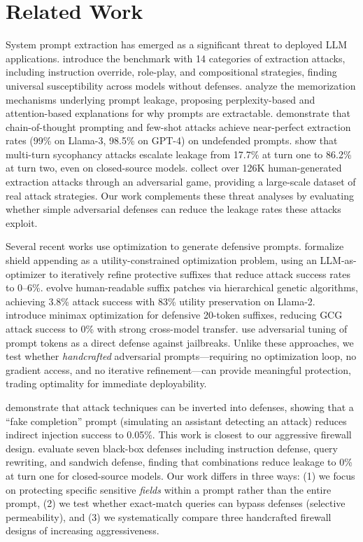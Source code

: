 \section{Related Work}
\label{sec:related}

System prompt extraction has emerged as a significant threat to deployed LLM applications.
\citet{wang2024raccoon} introduce the \raccoon benchmark with 14 categories of extraction attacks, including instruction override, role-play, and compositional strategies, finding universal susceptibility across models without defenses.
\citet{liang2024prompts} analyze the memorization mechanisms underlying prompt leakage, proposing perplexity-based and attention-based explanations for why prompts are extractable.
\citet{das2025system} demonstrate that chain-of-thought prompting and few-shot attacks achieve near-perfect extraction rates (99\% on Llama-3, 98.5\% on GPT-4) on undefended prompts.
\citet{agarwal2024prompt} show that multi-turn sycophancy attacks escalate leakage from 17.7\% at turn one to 86.2\% at turn two, even on closed-source models.
\citet{toyer2023tensor} collect over 126K human-generated extraction attacks through an adversarial game, providing a large-scale dataset of real attack strategies.
Our work complements these threat analyses by evaluating whether simple adversarial defenses can reduce the leakage rates these attacks exploit.

Several recent works use optimization to generate defensive prompts.
\citet{jawad2026psm} formalize shield appending as a utility-constrained optimization problem, using an LLM-as-optimizer to iteratively refine protective suffixes that reduce attack success rates to 0--6\%.
\citet{xiong2025dpp} evolve human-readable suffix patches via hierarchical genetic algorithms, achieving 3.8\% attack success with 83\% utility preservation on Llama-2.
\citet{zhou2024rpo} introduce minimax optimization for defensive 20-token suffixes, reducing GCG attack success to 0\% with strong cross-model transfer.
\citet{mo2024fight} use adversarial tuning of prompt tokens as a direct defense against jailbreaks.
Unlike these approaches, we test whether \emph{handcrafted} adversarial prompts---requiring no optimization loop, no gradient access, and no iterative refinement---can provide meaningful protection, trading optimality for immediate deployability.

\citet{chen2025dat} demonstrate that attack techniques can be inverted into defenses, showing that a ``fake completion'' prompt (simulating an assistant detecting an attack) reduces indirect injection success to 0.05\%.
This work is closest to our aggressive firewall design.
\citet{agarwal2024prompt} evaluate seven black-box defenses including instruction defense, query rewriting, and sandwich defense, finding that combinations reduce leakage to 0\% at turn one for closed-source models.
Our work differs in three ways: (1) we focus on protecting specific sensitive \emph{fields} within a prompt rather than the entire prompt, (2) we test whether exact-match queries can bypass defenses (selective permeability), and (3) we systematically compare three handcrafted firewall designs of increasing aggressiveness.

